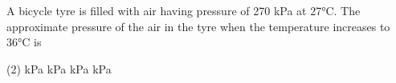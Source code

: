 \item A bicycle tyre is filled with air having pressure of 270 kPa at 27°C. The approximate pressure of the air in the tyre when the temperature increases to 36°C is
    \begin{tasks}(2)
         kPa
         kPa
         kPa
         kPa
    \end{tasks}